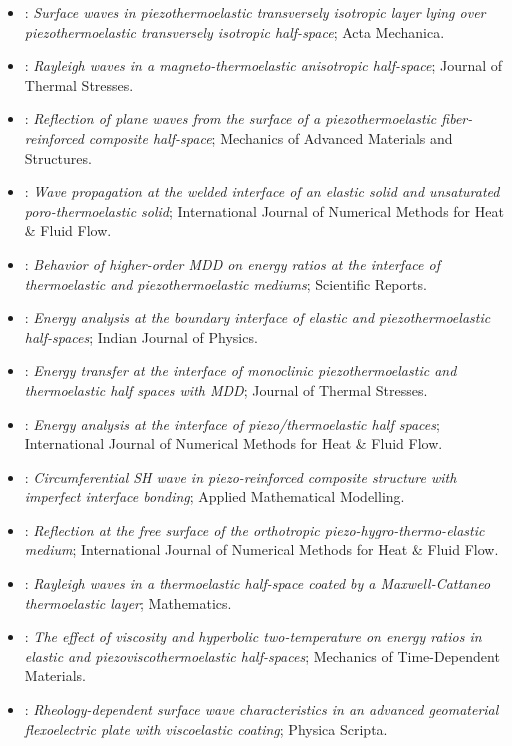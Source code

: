 \begin{itemize}
\item \citet{Biswas2020}: \emph{Surface waves in piezothermoelastic transversely isotropic layer lying over piezothermoelastic transversely isotropic half-space}; Acta Mechanica.
\item \citet{Biswas2020c}: \emph{Rayleigh waves in a magneto-thermoelastic anisotropic half-space}; Journal of Thermal Stresses.
\item \citet{Singh2020b}: \emph{Reflection of plane waves from the surface of a piezothermoelastic fiber-reinforced composite half-space}; Mechanics of Advanced Materials and Structures.
\item \citet{Kumar2022}: \emph{Wave propagation at the welded interface of an elastic solid and unsaturated poro-thermoelastic solid}; International Journal of Numerical Methods for Heat \& Fluid Flow.
\item \citet{Barak2023}: \emph{Behavior of higher-order MDD on energy ratios at the interface of thermoelastic and piezothermoelastic mediums}; Scientific Reports.
\item \citet{Barak2023IJP}: \emph{Energy analysis at the boundary interface of elastic and piezothermoelastic half-spaces}; Indian Journal of Physics.
\item \citet{Barak2023JTS}: \emph{Energy transfer at the interface of monoclinic piezothermoelastic and thermoelastic half spaces with MDD}; Journal of Thermal Stresses.
\item \citet{Gupta2023Energy}: \emph{Energy analysis at the interface of piezo/thermoelastic half spaces}; International Journal of Numerical Methods for Heat \& Fluid Flow.
\item \citet{Kumawat2023}: \emph{Circumferential SH wave in piezo-reinforced composite structure with imperfect interface bonding}; Applied Mathematical Modelling.
\item \citet{Yadav2023}: \emph{Reflection at the free surface of the orthotropic piezo-hygro-thermo-elastic medium}; International Journal of Numerical Methods for Heat \& Fluid Flow.
\item \citet{Chirita2024}: \emph{Rayleigh waves in a thermoelastic half-space coated by a Maxwell-Cattaneo thermoelastic layer}; Mathematics.
\item \citet{Kumar2024}: \emph{The effect of viscosity and hyperbolic two-temperature on energy ratios in elastic and piezoviscothermoelastic half-spaces}; Mechanics of Time-Dependent Materials.
\item \citet{Seema2024}: \emph{Rheology-dependent surface wave characteristics in an advanced geomaterial flexoelectric plate with viscoelastic coating}; Physica Scripta.
\end{itemize}
